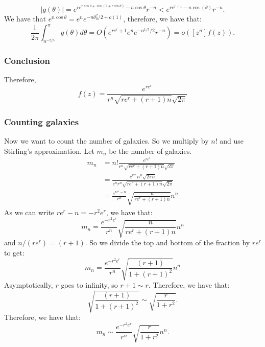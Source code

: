 \documentclass[]{article}
\theoremstyle{definition}
\numberwithin{theorem}{section}
\numberwithin{equation}{section}
\begin{document}
\begin{equation}
	|g(\theta)| = e^{r e^{r \cos \theta + \cos(\theta + r \sin \theta)} - n \cos \theta} r^{-n}< e^{r e^{r + 1} - n \cos(\theta)} r^{-n}. 
\end{equation}
We have that $e^{n \cos \theta} = e^n e^{- n \theta_0^2/2 + o(1)}$, therefore, we have that:
\begin{equation}
	\frac{1}{2 \pi} \int_{n^{-2/5}}^\pi g(\theta) d\theta = O(e^{r e^r + 1} e^{n} e^{-n^{1/5}/2} r^{-n} ) = o([z^n] f(z)).
\end{equation}

\subsubsection{Conclusion}
Therefore, 
\begin{equation}
	[z^n] f(z) = \frac{e^{r e^r}}{r^n \sqrt{r e^r + (r + 1)n} \sqrt{2\pi}}
\end{equation}

\subsubsection{Counting galaxies}

Now we want to count the number of galaxies. So we multiply by $n!$ and use Stirling's approximation. Let $m_n$ be the number of galaxies.
\begin{align*}
	m_n &= n!\frac{e^{r e^r}}{r^n \sqrt{r e^r + (r + 1)n} \sqrt{2\pi}}\\
	&= \frac{e^{r e^r} n^n \sqrt{2 \pi n}}{ e^n r^n \sqrt{r e^r + (r + 1)n} \sqrt{2\pi}}\\
	&= \frac{e^{r e^r - n}}{r^n} \sqrt{\frac{n}{r e^r + (r + 1)n }} n^n
\end{align*}
As we can write $r e^r - n = - r^2 e^r$, we have that:
\begin{equation}
	m_n = \frac{e^{- r^2 e^r}}{r^n} \sqrt{\frac{n}{r e^r + (r + 1)n }} n^n
\end{equation}
and $n/(r e^r) = (r + 1)$. So we divide the top and bottom of the fraction by $r e^r$ to get:
\begin{equation}
	m_n = \frac{e^{- r^2 e^r}}{r^n} \sqrt{\frac{(r + 1)}{1 + (r + 1)^2 }} n^n
\end{equation}
Asymptotically, $r$ goes to infinity, so $r + 1 \sim r$. Therefore, we have that:
\begin{equation}
	\sqrt{\frac{(r + 1)}{1 + (r + 1)^2}} \sim \sqrt{\frac{r}{1 + r^2}}.
\end{equation}
Therefore, we have that:
\begin{equation}
	m_n \sim \frac{e^{- r^2 e^r}}{r^n} \sqrt{\frac{r}{1 + r^2}} n^n.
\end{equation}
\end{document}
